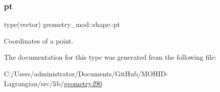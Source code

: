 \subsubsection{\texorpdfstring{pt}{pt}}
{\footnotesize\ttfamily type(vector) geometry\+\_\+mod\+::shape\+::pt\hspace{0.3cm}{\ttfamily [private]}}



Coordinates of a point. 



The documentation for this type was generated from the following file\+:\begin{DoxyCompactItemize}
\item 
C\+:/\+Users/administrator/\+Documents/\+Git\+Hub/\+M\+O\+H\+I\+D-\/\+Lagrangian/src/lib/\hyperlink{geometry_8f90}{geometry.\+f90}\end{DoxyCompactItemize}
